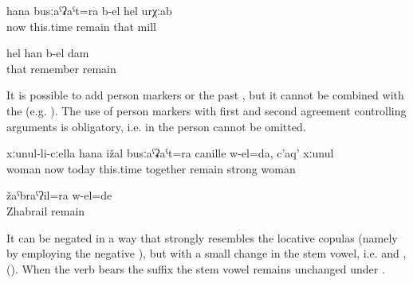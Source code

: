 \begin{exe}
	\ex	\label{ex:Even nowadays that mill remained (i.e. is still there)}
	\gll	hana	busːaˁʡaˁt=ra	b-el	hel	urχːab\\
		now	this.time	remain	that	mill\\
	\glt	{}

	\ex	\label{ex:I remember this (i.e. it remained in my memory)}
	\gll	hel	han	b-el	dam\\
		that	remember	remain	\\
	\glt	{}
\end{exe}

It is possible to add person markers  or the past  , but it cannot be combined with the  (e.g. ). The use of person markers with first and second agreement controlling arguments is obligatory, i.e. in  the person   cannot be omitted.

\begin{exe}
	\ex	\label{ex:I stayed together with my wife even until today; a good (strong) woman}
	\gll	xːunul-li-cːella hana	ižal	busːaˁʡaˁt=ra	canille	w-el=da,	c'aq'	xːunul\\
		woman	now	today	this.time	together	remain		strong	woman\\
	\glt	{}

	\ex	\label{ex:Zhabrail remained}
	\gll	žaˁbraˁʔil=ra	w-el=de\\
		Zhabrail	remain\\
	\glt	{}
\end{exe}

It can be negated in a way that strongly resembles the locative copulas (namely by employing the negative ), but with a small change in the stem vowel, i.e.  and  , (). When the verb  bears the  suffix  the stem vowel remains unchanged under  .

